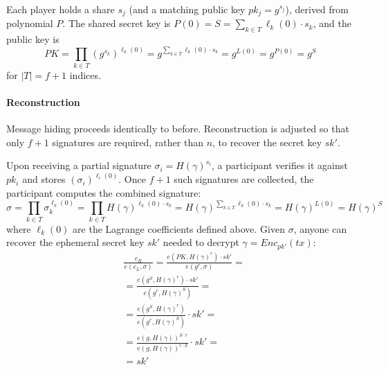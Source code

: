 Each player holds a share $s_j$ (and a matching public key \(pk_j=g^{s_j}\)), derived from polynomial $P$.
The shared secret key is $P(0)= S = \sum_{k \in T}{\ell_k(0)\cdot s_k}$,
and the public key is 
\[
  PK=
  \prod_{k\in T}{(g^{s_k})^{\ell_k(0)}} =
  g^{\sum_{k\in T}{\ell_k(0)\cdot s_k}} =
  g^{L(0)}=g^{P(0)}=g^S 
\]
for $|T|=f+1$ indices.





\paragraph{Reconstruction}
Message hiding proceeds identically to before. Reconstruction is adjusted so that only $f+1$ signatures are required, rather than $n$, to recover the secret key $sk'$.

Upon receiving a partial signature \(\sigma_{i}=H\left(\gamma\right)^{s_{i}}\), a participant verifies it against \(pk_i\) and stores \((\sigma_i)^{\ell_i(0)}\).
Once $f+1$ such signatures are collected, the participant computes the combined signature:
\[
  \sigma=\prod_{k\in T}{\sigma_k^{\ell_k(0)}} = 
  \prod_{k\in T}{H\left(\gamma\right)^{\ell_k(0)\cdot s_{k}}} = 
  H\left(\gamma\right)^{\sum_{k\in T}{\ell_k(0)\cdot s_{k}}}=
  H\left(\gamma\right)^{L(0)} =
  H\left(\gamma\right)^{S}
\]
where $\ell_k(0)$ are the Lagrange coefficients defined above.
Given $\sigma$, anyone can recover the ephemeral secret key $sk'$ needed to decrypt $\gamma=Enc_{pk'}\left(tx\right)$:
\begin{align*}
 & \frac{c_{R}}{e\left(c_{L},\sigma\right)}=\frac{e\left(PK, H\left(\gamma\right)^{r}\right)\cdot sk'}{e\left(g^{r},\sigma\right)}=\\
 & =\frac{e\left(g^S, H\left(\gamma\right)^{r}\right)\cdot sk'}{e\left(g^{r},H(\gamma)^S\right)}=\\
 & =\frac{e\left(g^S, H\left(\gamma\right)^{r}\right)}{e\left(g^{r},H(\gamma)^S\right)} \cdot sk'=\\
 & =\frac{e\left(g, H\left(\gamma\right)\right)^{S\cdot r}}{e\left(g,H(\gamma)\right)^{r\cdot S}} \cdot sk'=\\
 & =sk'
\end{align*}

